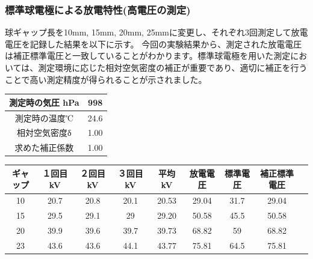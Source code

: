 \documentclass[a4paper,11pt,xelatex,ja=standard]{bxjsarticle}
\begin{document}
            \subsubsection{標準球電極による放電特性(高電圧の測定)}
                球ギャップ長を10mm, 15mm, 20mm, 25mmに変更し、それぞれ3回測定して放電電圧を記録した結果を以下に示す。
                今回の実験結果から、測定された放電電圧は補正標準電圧と一致していることがわかります。標準球電極を用いた測定においては、測定環境に応じた相対空気密度の補正が重要であり、適切に補正を行うことで高い測定精度が得られることが示されました。
                \begin{table}[H]
                    \centering
                    \begin{tabular}{|c|c|}
                        \hline
                        測定時の気圧 hPa & 998 \\
                        \hline
                        測定時の温度℃ & 24.6 \\
                        \hline
                        相対空気密度δ & 1.00 \\
                        \hline
                        求めた補正係数 & 1.00 \\
                        \hline
                    \end{tabular}
                \end{table}
                
                \begin{table}[H]
                    \centering
                    \begin{tabular}{|c|c|c|c|c|c|c|c|c|}
                        \hline
                        ギャップ & １回目 kV & ２回目 kV & ３回目 kV & 平均 kV & 放電電圧 & 標準電圧 & 補正標準電圧 \\
                        \hline
                        10 & 20.7 & 20.8 & 20.1 & 20.53 & 29.04 & 31.7 & 29.04 \\
                        \hline
                        15 & 29.5 & 29.1 & 29 & 29.20 & 50.58 & 45.5 & 50.58 \\
                        \hline
                        20 & 39.9 & 39.6 & 39.7 & 39.73 & 68.82 & 59 & 68.82 \\
                        \hline
                        23 & 43.6 & 43.6 & 44.1 & 43.77 & 75.81 & 64.5 & 75.81 \\
                        \hline
                    \end{tabular}
                \end{table}
\end{document}

